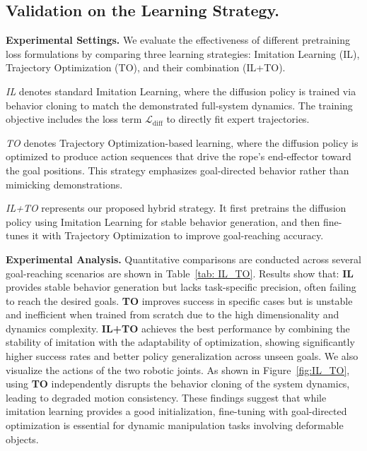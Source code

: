 \documentclass{article}
\begin{document}
\subsection{Validation on the Learning Strategy.}
\textbf{Experimental Settings.} We evaluate the effectiveness of different pretraining loss formulations by comparing three learning strategies: Imitation Learning (IL), Trajectory Optimization (TO), and their combination (IL+TO).

\textit{IL} denotes standard Imitation Learning, where the diffusion policy is trained via behavior cloning to match the demonstrated full-system dynamics. The training objective includes the loss term $\mathcal{L}_{\text{diff}}$ to directly fit expert trajectories.

\textit{TO} denotes Trajectory Optimization-based learning, where the diffusion policy is optimized to produce action sequences that drive the rope’s end-effector toward the goal positions. This strategy emphasizes goal-directed behavior rather than mimicking demonstrations.

\textit{IL+TO} represents our proposed hybrid strategy. It first pretrains the diffusion policy using Imitation Learning for stable behavior generation, and then fine-tunes it with Trajectory Optimization to improve goal-reaching accuracy.

\textbf{Experimental Analysis.}  
Quantitative comparisons are conducted across several goal-reaching scenarios are shown in Table~\ref{tab: IL_TO}. Results show that: \textbf{IL} provides stable behavior generation but lacks task-specific precision, often failing to reach the desired goals.
\textbf{TO} improves success in specific cases but is unstable and inefficient when trained from scratch due to the high dimensionality and dynamics complexity. \textbf{IL+TO} achieves the best performance by combining the stability of imitation with the adaptability of optimization, showing significantly higher success rates and better policy generalization across unseen goals. 
We also visualize the actions of the two robotic joints. As shown in Figure~\ref{fig:IL_TO}, using \textbf{TO} independently disrupts the behavior cloning of the system dynamics, leading to degraded motion consistency.
These findings suggest that while imitation learning provides a good initialization, fine-tuning with goal-directed optimization is essential for dynamic manipulation tasks involving deformable objects.
 
\end{document}
